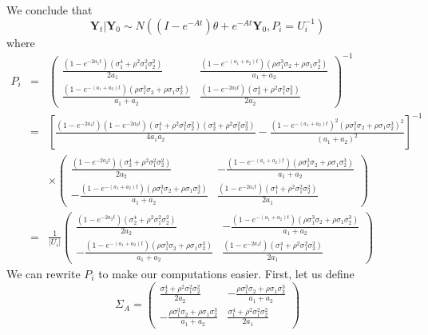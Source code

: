 \documentclass[12pt]{article}
\begin{document}
We conclude that
\begin{equation*}
\textbf{Y}_t | \textbf{Y}_0 \sim N \left(( I - e^{-At} ) \theta + e^{-At}\textbf{Y}_0,  P_i = U_i^{-1} \right) 
\end{equation*}
where
\begin{eqnarray*}
P_i & = &  \left( \begin{array}{cc}
\frac{(1- e^{-2a_1 t}) (\sigma_1^4 + \rho^2 \sigma_1^2 \sigma_2^2 ) }{2 a_1} & \frac{(1 - e^{-(a_1 + a_2) t}) (\rho \sigma_1^3 \sigma_2 + \rho \sigma_1 \sigma_2^3) }{a_1 + a_2}  \\
\frac{(1 - e^{ -(a_1 +a_2) t}) (\rho \sigma_1^3 \sigma_2 + \rho \sigma_1 \sigma_2^3) }{a_1 + a_2} & \frac{ (1 - e^{-2 a_2 t}) (\sigma_2^4 + \rho^2 \sigma_1^2 \sigma_2^2 ) }{2 a_2}  \end{array} \right) ^{-1} \\
& = & \left[ \frac{(1-e^{-2a_1 t})(1-e^{-2a_2 t})(\sigma_1^4 + \rho^2 \sigma_1^2 \sigma_2^2 )(\sigma_2^4 + \rho^2 \sigma_1^2 \sigma_2^2 )}{4a_1a_2}   
- \frac{ (1 - e^{ -(a_1 +a_2) t})^2 (\rho \sigma_1^3 \sigma_2 + \rho \sigma_1 \sigma_2^3)^2 }{(a_1 + a_2)^2}   \right]^{-1} \\
& & \times  \left( \begin{array}{cc}
\frac{(1- e^{-2a_2 t}) (\sigma_2^4 + \rho^2 \sigma_1^2 \sigma_2^2 ) }{2 a_2} & - \frac{(1 - e^{-(a_1 + a_2) t}) (\rho \sigma_1^3 \sigma_2 + \rho \sigma_1 \sigma_2^3) }{a_1 + a_2}  \\
- \frac{(1 - e^{ -(a_1 +a_2) t}) (\rho \sigma_1^3 \sigma_2 + \rho \sigma_1 \sigma_2^3) }{a_1 + a_2} & \frac{ (1 - e^{-2 a_1 t}) (\sigma_1^4 + \rho^2 \sigma_1^2 \sigma_2^2 ) }{2 a_1}  \end{array} \right) \\
& = & \frac{1}{|U_i|} \left( \begin{array}{cc}
\frac{(1- e^{-2a_2 t}) (\sigma_2^4 + \rho^2 \sigma_1^2 \sigma_2^2 ) }{2 a_2} & - \frac{(1 - e^{-(a_1 + a_2) t}) (\rho \sigma_1^3 \sigma_2 + \rho \sigma_1 \sigma_2^3) }{a_1 + a_2}  \\
- \frac{(1 - e^{ -(a_1 +a_2) t}) (\rho \sigma_1^3 \sigma_2 + \rho \sigma_1 \sigma_2^3) }{a_1 + a_2} & \frac{ (1 - e^{-2 a_1 t}) (\sigma_1^4 + \rho^2 \sigma_1^2 \sigma_2^2 ) }{2 a_1}  \end{array} \right)
\end{eqnarray*}
We can rewrite $P_i$ to make our computations easier.  First, let us define
\begin{equation*}
\Sigma_A = \left( \begin{array}{cc}
\frac{ \sigma_2^4 + \rho^2 \sigma_1^2 \sigma_2^2  }{2 a_2} & - \frac{\rho \sigma_1^3 \sigma_2 + \rho \sigma_1 \sigma_2^3 }{a_1 + a_2}  \\
- \frac{ \rho \sigma_1^3 \sigma_2 + \rho \sigma_1 \sigma_2^3 }{a_1 + a_2} & \frac{ \sigma_1^4 + \rho^2 \sigma_1^2 \sigma_2^2  }{2 a_1}  \end{array} \right) 
\end{equation*}
\end{document}
